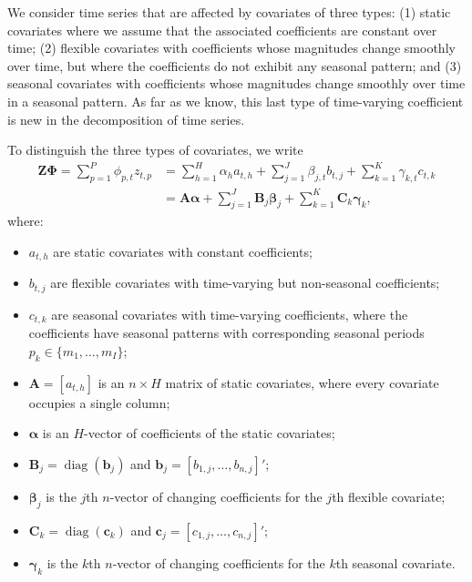 \documentclass[ijds,nonblindrev]{informs-ijds}
\providecommand{\tightlist}{%
  \setlength{\itemsep}{0pt}\setlength{\parskip}{0pt}}
\begin{document}
We consider time series that are affected by covariates of three types: (1) static covariates where we assume that the associated coefficients are constant over time; (2) flexible covariates with coefficients whose magnitudes change smoothly over time, but where the coefficients do not exhibit any seasonal pattern; and (3) seasonal covariates with coefficients whose magnitudes change smoothly over time in a seasonal pattern. As far as we know, this last type of time-varying coefficient is new in the decomposition of time series.

To distinguish the three types of covariates, we write
\begin{align*}
  \bm{Z}\bm{\Phi} = \sum_{p=1}^P \phi_{p,t}z_{t,p}
  & =
    \sum_{h=1}^{H} \alpha_{h}{a}_{t,h} +
    \sum_{j=1}^{J} \beta_{j,t}{b}_{t,j} +
    \sum_{k=1}^{K} \gamma_{k,t}{c}_{t,k} \\
  & =
    \bm{A}\bm{\alpha} +
    \sum_{j=1}^{J} \bm{B}_j \bm{\beta}_j +
    \sum_{k=1}^{K} \bm{C}_k \bm{\gamma}_{k},
\end{align*}
where:

\begin{itemize}
\tightlist
\item
  \(a_{t,h}\) are static covariates with constant coefficients;
\item
  \(b_{t,j}\) are flexible covariates with time-varying but non-seasonal coefficients;
\item
  \(c_{t,k}\) are seasonal covariates with time-varying coefficients, where the coefficients have seasonal patterns with corresponding seasonal periods \(p_k \in \{m_1,\dots,m_I\}\);
\item
  \(\bm{A} = [a_{t,h}]\) is an \(n \times H\) matrix of static covariates, where every covariate occupies a single column;
\item
  \(\bm{\alpha}\) is an \(H\)-vector of coefficients of the static covariates;
\item
  \(\bm{B}_j = \operatorname{diag}(\bm{b}_j)\) and \(\bm{b}_j = [b_{1,j},\dots,b_{n,j}]'\);
\item
  \(\bm{\beta}_j\) is the \(j\)th \(n\)-vector of changing coefficients for the \(j\)th flexible covariate;
\item
  \(\bm{C}_k = \operatorname{diag}(\bm{c}_k)\) and \(\bm{c}_j = [c_{1,j},\dots,c_{n,j}]'\);
\item
  \(\bm{\gamma}_k\) is the \(k\)th \(n\)-vector of changing coefficients for the \(k\)th seasonal covariate.
\end{itemize}
\end{document}

